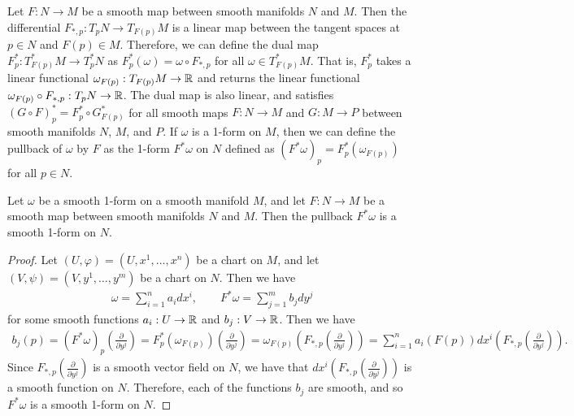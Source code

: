 Let $F:N \to M$ be a smooth map between smooth manifolds $N$ and $M$. Then the differential $F_{\ast,p}:T_{p}N \to T_{F(p)}M$ is a linear map between the tangent spaces at $p \in N$ and $F(p) \in M$. Therefore, we can define the dual map $F^{\ast}_{p}:T^{\ast}_{F(p)}M \to T^{\ast}_{p}N$ as $F^{\ast}_{p}(\omega) = \omega \circ F_{\ast,p}$ for all $\omega \in T^{\ast}_{F(p)}M$. That is, $F^{\ast}_{p}$ takes a linear functional $\omega_{F(p)}:T_{F(p)}M \to \mathbb{R}$ and returns the linear functional $\omega_{F(p)} \circ F_{\ast,p}:T_{p}N \to \mathbb{R}$. The dual map is also linear, and satisfies $(G \circ F)^{\ast}_{p} = F^{\ast}_{p} \circ G^{\ast}_{F(p)}$ for all smooth maps $F:N \to M$ and $G:M \to P$ between smooth manifolds $N$, $M$, and $P$. If $\omega$ is a 1-form on $M$, then we can define the pullback of $\omega$ by $F$ as the 1-form $F^{\ast}\omega$ on $N$ defined as $(F^{\ast}\omega)_{p} = F^{\ast}_{p}(\omega_{F(p)})$ for all $p \in N$.

\begin{proposition}
    Let $\omega$ be a smooth 1-form on a smooth manifold $M$, and let $F:N \to M$ be a smooth map between smooth manifolds $N$ and $M$. Then the pullback $F^{\ast}\omega$ is a smooth 1-form on $N$.
\end{proposition}
\begin{proof}
    Let $(U,\varphi) = (U,x^{1},\ldots,x^{n})$ be a chart on $M$, and let $(V,\psi) = (V,y^{1},\ldots,y^{m})$ be a chart on $N$. Then we have
    \begin{align}
        \omega = \sum_{i=1}^{n} a_{i} dx^{i}, \qquad F^{\ast}\omega = \sum_{j=1}^{m} b_{j} dy^{j}
    \end{align}
    for some smooth functions $a_{i}:U \to \mathbb{R}$ and $b_{j}:V \to \mathbb{R}$. Then we have
    \begin{align}
        b_{j}(p) = (F^{\ast}\omega)_{p}\left(\frac{\partial}{\partial y^{j}}\right) = F^{\ast}_{p}(\omega_{F(p)})\left(\frac{\partial}{\partial y^{j}}\right) = \omega_{F(p)}(F_{\ast,p}\left(\frac{\partial}{\partial y^{j}}\right)) = \sum_{i=1}^{n} a_{i}(F(p)) dx^{i}(F_{\ast,p}\left(\frac{\partial}{\partial y^{j}}\right)).
    \end{align}
    Since $F_{\ast,p}\left(\frac{\partial}{\partial y^{j}}\right)$ is a smooth vector field on $N$, we have that $dx^{i}(F_{\ast,p}\left(\frac{\partial}{\partial y^{j}}\right))$ is a smooth function on $N$. Therefore, each of the functions $b_{j}$ are smooth, and so $F^{\ast}\omega$ is a smooth 1-form on $N$.
\end{proof}

